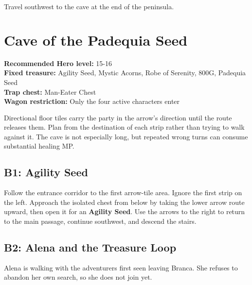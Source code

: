 \documentclass[
  american,
  10pt,
  letterpaper,
  oneside,
  open=any]{scrreprt}
\begin{document}
Travel southwest to the cave at the end of the peninsula.

\section{Cave of the Padequia Seed}\label{cave-of-the-padequia-seed}

\textbf{Recommended Hero level:} 15-16\\
\textbf{Fixed treasure:} Agility Seed, Mystic Acorns, Robe of Serenity,
800G, Padequia Seed\\
\textbf{Trap chest:} Man-Eater Chest\\
\textbf{Wagon restriction:} Only the four active characters enter

Directional floor tiles carry the party in the arrow's direction until
the route releases them. Plan from the destination of each strip rather
than trying to walk against it. The cave is not especially long, but
repeated wrong turns can consume substantial healing MP.

\subsection{B1: Agility Seed}\label{b1-agility-seed}

Follow the entrance corridor to the first arrow-tile area. Ignore the
first strip on the left. Approach the isolated chest from below by
taking the lower arrow route upward, then open it for an \textbf{Agility
Seed}. Use the arrows to the right to return to the main passage,
continue southwest, and descend the stairs.

\subsection{B2: Alena and the Treasure
Loop}\label{b2-alena-and-the-treasure-loop}

Alena is walking with the adventurers first seen leaving Branca. She
refuses to abandon her own search, so she does not join yet.
\end{document}
